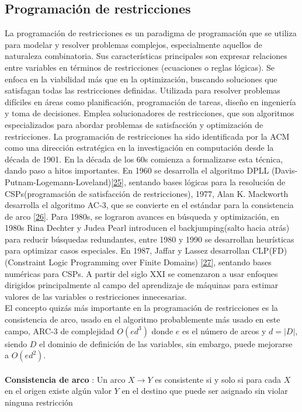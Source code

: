\documentclass{article}
\begin{document}
    \subsection*{ \Large Programación de restricciones}

La programación de restricciones es un paradigma de programación que se utiliza para modelar y resolver problemas complejos, especialmente aquellos de naturaleza
combinatoria. Sus características principales son expresar relaciones entre variables en términos de restricciones (ecuaciones o reglas lógicas). Se enfoca en la
viabilidad más que en la optimización, buscando soluciones que satisfagan todas las restricciones definidas. Utilizada para resolver problemas difíciles en áreas
como planificación, programación de tareas, diseño en ingeniería y toma de decisiones. Emplea solucionadores de restricciones, que son algoritmos especializados
para abordar problemas de satisfacción y optimización de restricciones. La programación de restricciones ha sido identificada por la ACM como una dirección estratégica
en la investigación en computación desde la década de 1901. En la década de los 60s comienza a formalizarse esta técnica, dando paso a hitos importantes. En 1960
se desarrolla el algoritmo DPLL (Davis-Putnam-Logemann-Loveland)\hyperref[sec:35]{[25]}, sentando bases lógicas para la resolución de CSPs(programación de satisfacción de restricciones), 1977, Alan K. Mackworth
desarrolla el algoritmo AC-3, que se convierte en el estándar para la consistencia de arco \hyperref[sec:36]{[26]}. Para 1980s, se lograron avances en búsqueda y optimización, en 1980s Rina
Dechter y Judea Pearl introducen el backjumping(salto hacia atrás) para reducir búsquedas redundantes, entre 1980 y 1990 se desarrollan heurísticas para optimizar
casos especiales. En 1987, Jaffar y Lassez desarrollan CLP(FD) (Constraint Logic Programming over Finite Domains) \hyperref[sec:37]{[27]}, sentando bases numéricas para CSPs. A partir del siglo XXI se comenzaron a usar
enfoques dirigidos principalmente al campo del aprendizaje de máquinas para estimar valores de las variables o restricciones innecesarias. \\

El concepto quizás más importante en la programación de restricciones es la consistencia de arco, usado en el algoritmo probablemente más usado en este campo, ARC-3 de complejidad $O(ed^3)$ donde $e$ es el número de arcos y $d=|D|$, siendo $D$ el dominio de definición de las variables, sin embargo, puede mejorarse a $O(ed^2)$. \\ \\
\textbf{ Consistencia de arco }: Un arco $X \rightarrow Y$ es consistente si y solo si para cada $X$ en el origen existe algún valor $Y$ en el destino que puede ser asignado sin violar ninguna restricción \\
\end{document}
